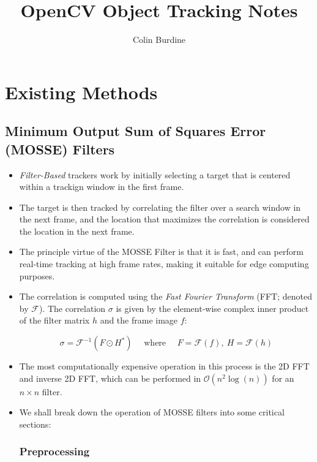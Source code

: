 \documentclass[12pt]{article}
\author{Colin Burdine}
\title{OpenCV Object Tracking Notes}
\date{}
\begin{document}
\maketitle

\section{Existing Methods}

\subsection{Minimum Output Sum of Squares Error (MOSSE) Filters \cite{bolme_mosse}}

\begin{itemize}
\item \textit{Filter-Based} trackers work by initially selecting a target that is centered within a trackign window in the first frame.

\item The target is then tracked by correlating the filter over a search window in the next frame, and the location that maximizes the correlation is considered the location in the next frame.

\item The principle virtue of the MOSSE Filter is that it is fast, and can perform real-time tracking at high frame rates, making it suitable for edge computing purposes.

\item The correlation is computed using the \textit{Fast Fourier Transform} (FFT; denoted by $\mathcal{F}$). The correlation $\sigma$ is given by the element-wise complex inner product of the filter matrix $h$ and the frame image $f$:

$$\sigma = \mathcal{F}^{-1}(F \odot H^*)\quad \text{ where }\quad F = \mathcal{F}(f),\ H = \mathcal{F}(h)$$

\item The most computationally expensive operation in this process is the 2D FFT and inverse 2D FFT, which can be performed in $\mathcal{O}(n^2\log(n))$ for an $n\times n$ filter.

\item We shall break down the operation of MOSSE filters into some critical sections:

\subsubsection*{Preprocessing}


\end{itemize}
\end{document}
